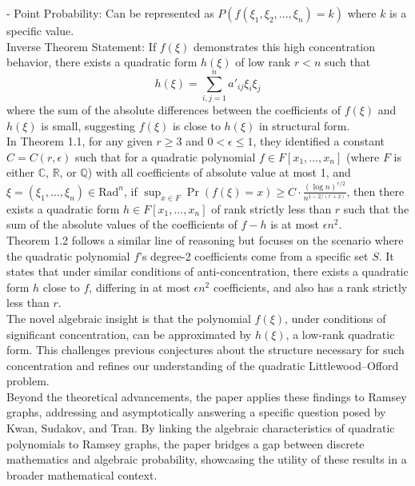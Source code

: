 - Point Probability: Can be represented as ${P(f(\xi_1, \xi_2,...,\xi_n) = k)}$ where ${k}$ is a specific value.\\\newline
Inverse Theorem Statement: If ${f(\xi)}$ demonstrates this high concentration behavior, there exists a quadratic form ${h(\xi)}$ of low rank ${r < n}$ such that
$${h(\xi) = \sum_{i,j=1}^{n} a'_{ij} \xi_i \xi_j
}$$
where the sum of the absolute differences between the coefficients of ${f(\xi)}$ and ${h(\xi)}$ is small, suggesting ${f(\xi)}$ is close to ${h(\xi)}$ in structural form.
\\\newline
In Theorem 1.1, for any given $r \geq 3$ and $0 < \epsilon \leq 1$, they identified a constant $C = C(r, \epsilon)$ such that for a quadratic polynomial $f \in F[x_1, \dots, x_n]$ (where $F$ is either $\mathbb{C}$, $\mathbb{R}$, or $\mathbb{Q}$) with all coefficients of absolute value at most 1, and $\xi = (\xi_1, \dots, \xi_n) \in \text{Rad}^n$, if ${\sup_{x \in F} \Pr(f(\xi) = x) \geq C \cdot \frac{(\log n)^{r/2}}{n^{1-2/(r+2)}}}$,
then there exists a quadratic form $h \in F[x_1, \dots, x_n]$ of rank strictly less than $r$ such that the sum of the absolute values of the coefficients of $f - h$ is at most $\epsilon n^2$.\\\newline
Theorem 1.2 follows a similar line of reasoning but focuses on the scenario where the quadratic polynomial ${f}$'s degree-2 coefficients come from a specific set $S$. It states that under similar conditions of anti-concentration, there exists a quadratic form $h$ close to ${f}$, differing in at most $\epsilon n^2$ coefficients, and also has a rank strictly less than $r$.\\\newline
The novel algebraic insight is that the polynomial ${f(\xi)}$, under conditions of significant concentration, can be approximated by ${h(\xi)}$, a low-rank quadratic form. This challenges previous conjectures about the structure necessary for such concentration and refines our understanding of the quadratic Littlewood–Offord problem.\\\newline
Beyond the theoretical advancements, the paper applies these findings to Ramsey graphs, addressing and asymptotically answering a specific question posed by Kwan, Sudakov, and Tran. By linking the algebraic characteristics of quadratic polynomials to Ramsey graphs, the paper bridges a gap between discrete mathematics and algebraic probability, showcasing the utility of these results in a broader mathematical context.\\\newline
